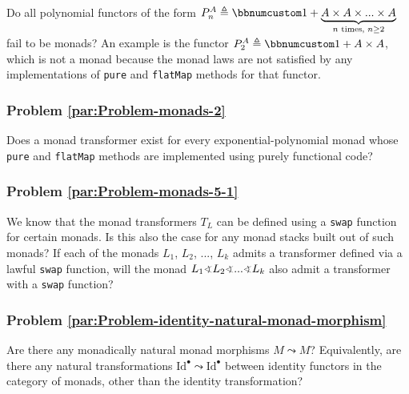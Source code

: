 Do all polynomial functors of the form $P_{n}^{A}\triangleq\bbnum 1+\underbrace{A\times A\times...\times A}_{n\text{ times, }n\ge2}$
fail to be monads? An example is the functor $P_{2}^{A}\triangleq\bbnum 1+A\times A$,
which is not a monad because the monad laws are not satisfied by any
implementations of \lstinline!pure! and \lstinline!flatMap! methods
for that functor.

\subsubsection{Problem \label{par:Problem-monads-2}\ref{par:Problem-monads-2}}

Does a monad transformer exist for every exponential-polynomial monad
whose \lstinline!pure! and \lstinline!flatMap! methods are implemented
using purely functional code?

\subsubsection{Problem \label{par:Problem-monads-5-1}\ref{par:Problem-monads-5-1}}

We know that the monad transformers $T_{L}$ can be defined using
a \lstinline!swap! function for certain monads. Is this also the
case for any monad stacks built out of such monads? If each of the
monads $L_{1}$, $L_{2}$, ..., $L_{k}$ admits a transformer defined
via a lawful \lstinline!swap! function, will the monad $L_{1}\varangle L_{2}\varangle...\varangle L_{k}$
also admit a transformer with a \lstinline!swap! function?

\subsubsection{Problem \label{par:Problem-identity-natural-monad-morphism}\ref{par:Problem-identity-natural-monad-morphism}}

Are there any monadically natural monad morphisms $M\leadsto M$?
Equivalently, are there any natural transformations $\text{Id}^{\bullet}\leadsto\text{Id}^{\bullet}$
between identity functors in the category of monads, other than the
identity transformation?

